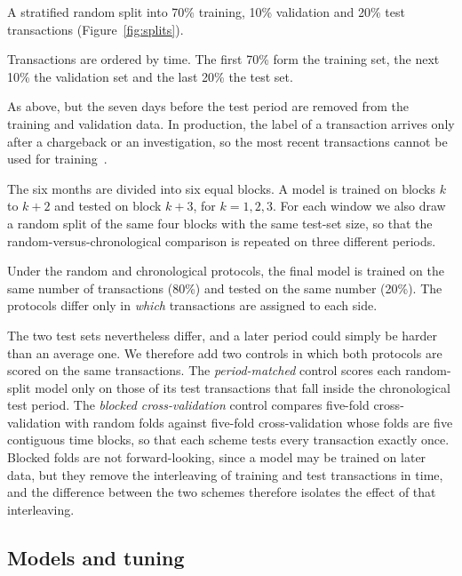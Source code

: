 

\begin{description}[leftmargin=1em,itemsep=2pt]
\item[Random.] A stratified random split into 70\% training, 10\% validation and 20\% test transactions (Figure~\ref{fig:splits}).
\item[Chronological.] Transactions are ordered by time. The first 70\% form the training set, the next 10\% the validation set and the last 20\% the test set.
\item[Chronological with a gap (IEEE-CIS).] As above, but the seven days before the test period are removed from the training and validation data. In production, the label of a transaction arrives only after a chargeback or an investigation, so the most recent transactions cannot be used for training~\cite{dalpozzolo2018credit}.
\item[Rolling windows (IEEE-CIS).] The six months are divided into six equal blocks. A model is trained on blocks $k$ to $k{+}2$ and tested on block $k{+}3$, for $k=1,2,3$. For each window we also draw a random split of the same four blocks with the same test-set size, so that the random-versus-chronological comparison is repeated on three different periods.
\end{description}

Under the random and chronological protocols, the final model is trained on the same number of transactions (80\%) and tested on the same number (20\%). The protocols differ only in \emph{which} transactions are assigned to each side.

The two test sets nevertheless differ, and a later period could simply be harder than an average one. We therefore add two controls in which both protocols are scored on the same transactions. The \emph{period-matched} control scores each random-split model only on those of its test transactions that fall inside the chronological test period. The \emph{blocked cross-validation} control compares five-fold cross-validation with random folds against five-fold cross-validation whose folds are five contiguous time blocks, so that each scheme tests every transaction exactly once. Blocked folds are not forward-looking, since a model may be trained on later data, but they remove the interleaving of training and test transactions in time, and the difference between the two schemes therefore isolates the effect of that interleaving.

\subsection{Models and tuning}

